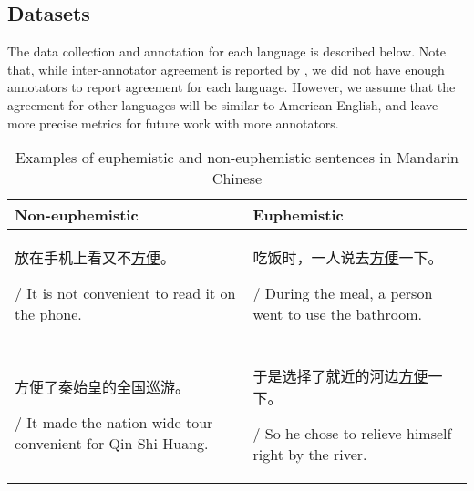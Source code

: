\documentclass[11pt]{article}
\begin{document}
\subsection{Datasets}
The data collection and annotation for each language is described below. Note that, while inter-annotator agreement is reported by \cite{gavidia-etal-2022-cats}, we did not have enough annotators to report agreement for each language. However, we assume that the agreement for other languages will be similar to American English, and leave more precise metrics for future work with more annotators.

\begin{table*}[!h]
\begin{small}
    \centering
    \begin{tabular}{p{7cm}|p{7cm}}
    \textbf{Non-euphemistic} & \textbf{Euphemistic}\\\hline
\begin{CJK}{UTF8}{gbsn} 放在手机上看又不\underline{方便}。 \end{CJK} / It is not convenient to read it on the phone. & \begin{CJK}{UTF8}{gbsn} 吃饭时，一人说去\underline{方便}一下。 \end{CJK} / During the meal, a person went to use the bathroom. \\
         \hline
& \\\begin{CJK}{UTF8}{gbsn} \underline{方便}了秦始皇的全国巡游。 \end{CJK} / It made the nation-wide tour convenient for Qin Shi Huang. & \begin{CJK}{UTF8}{gbsn} 于是选择了就近的河边\underline{方便}一下。 \end{CJK} / So he chose to relieve himself right by the river. \\
\hline
    \end{tabular}
    \caption{Examples of euphemistic and non-euphemistic sentences in Mandarin Chinese}
    \label{tab:chinese}
    \end{small}
\end{table*}
\end{document}
